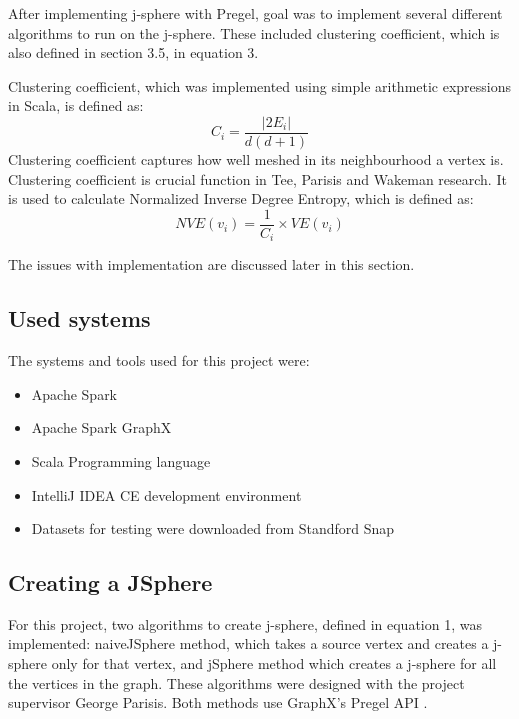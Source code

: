 \documentclass{article}
\theoremstyle{definition}
\begin{document}
After implementing j-sphere with Pregel, goal was to implement several different algorithms to run on the j-sphere. These included clustering coefficient, which is also defined in section 3.5, in equation 3.

Clustering coefficient, which was implemented using simple arithmetic expressions in Scala, is defined as: 
\begin{equation}
C_{i} = \frac{|2E_{i}|}{d(d+1)}
\end{equation}
Clustering coefficient captures how well meshed in its neighbourhood a vertex is. Clustering coefficient is crucial function in Tee, Parisis and Wakeman research. It is used to calculate Normalized Inverse Degree Entropy, which is defined as:
\begin{equation}
NVE(v_{i}) = \frac{1}{C_{i}} \times VE(v_{i})
\end{equation} 

The issues with implementation are discussed later in this section. 

\subsection{Used systems}
The systems and tools used for this project were:
\begin{itemize}
\item Apache Spark
\item Apache Spark GraphX
\item Scala Programming language
\item IntelliJ IDEA CE development environment
\item Datasets for testing were downloaded from Standford Snap
\end{itemize}

\subsection{Creating a JSphere}

For this project, two algorithms to create j-sphere, defined in equation 1, was implemented: naiveJSphere method, which takes a source vertex and creates a j-sphere only for that vertex, and jSphere method which creates a j-sphere for all the vertices in the graph. These algorithms were designed with the project supervisor George Parisis. Both methods use GraphX's Pregel API \cite{GraphX}. \\
\end{document}
